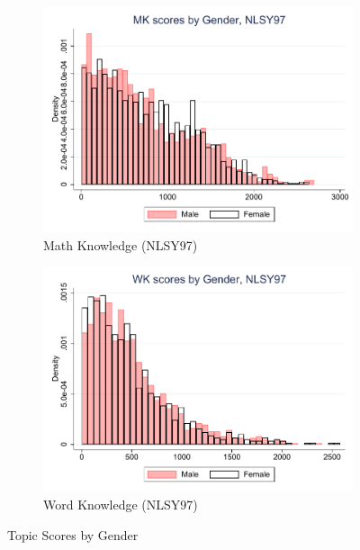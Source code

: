 \documentclass[onehalfspacing,11pt]{article}
\begin{document}
\begin{figure}
		\begin{subfigure}{0.49\textwidth}
		\includegraphics[width=\linewidth]{NLSY97_MK_gender.pdf}
		\caption{Math Knowledge (NLSY97)} \label{fig:nlsy97math}
	\end{subfigure}
	\hspace*{\fill} %
	\begin{subfigure}{0.49\textwidth}
		\includegraphics[width=\linewidth]{NLSY97_WK_gender.pdf}
		\caption{Word Knowledge (NLSY97)} \label{fig:nlsy97wprd}
	\end{subfigure}

	\caption{Topic Scores by Gender}
	\label{fig:nlsy_by_gender}
\end{figure}
\end{document}
